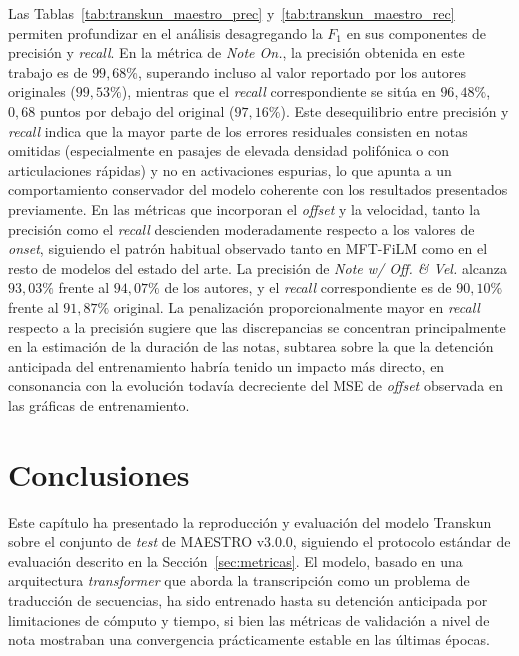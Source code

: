 \documentclass[11pt,spanish,listoffigures,listoftables]{tfgetsinf}
\begin{document}
Las Tablas~\ref{tab:transkun_maestro_prec} y~\ref{tab:transkun_maestro_rec} 
permiten profundizar en el análisis desagregando la $F_1$ en sus componentes de 
precisión y \textit{recall}. En la métrica de \textit{Note On.}, la precisión 
obtenida en este trabajo es de $99{,}68\%$, superando incluso al valor reportado 
por los autores originales ($99{,}53\%$), mientras que el \textit{recall} 
correspondiente se sitúa en $96{,}48\%$, $0{,}68$ puntos por debajo del original 
($97{,}16\%$). Este desequilibrio entre precisión y \textit{recall} indica que 
la mayor parte de los errores residuales consisten en notas omitidas (especialmente 
en pasajes de elevada densidad polifónica o con articulaciones rápidas) y no en 
activaciones espurias, lo que apunta a un comportamiento conservador del modelo 
coherente con los resultados presentados previamente. En las métricas que 
incorporan el \textit{offset} y la velocidad, tanto la precisión como el 
\textit{recall} descienden moderadamente respecto a los valores de \textit{onset}, 
siguiendo el patrón habitual observado tanto en MFT-FiLM como en el resto de 
modelos del estado del arte. La precisión de \textit{Note w/ Off. \& Vel.} alcanza 
$93{,}03\%$ frente al $94{,}07\%$ de los autores, y el \textit{recall} 
correspondiente es de $90{,}10\%$ frente al $91{,}87\%$ original. La penalización 
proporcionalmente mayor en \textit{recall} respecto a la precisión sugiere que las 
discrepancias se concentran principalmente en la estimación de la duración de las 
notas, subtarea sobre la que la detención anticipada del entrenamiento habría tenido 
un impacto más directo, en consonancia con la evolución todavía decreciente del 
MSE de \textit{offset} observada en las gráficas de entrenamiento.


\section{Conclusiones}
\label{sec:transkun_conclusiones}

Este capítulo ha presentado la reproducción y evaluación del modelo 
Transkun~\cite{yan2024transkun} sobre el conjunto de \textit{test} de MAESTRO 
v3.0.0, siguiendo el protocolo estándar de evaluación descrito en la 
Sección~\ref{sec:metricas}. El modelo, basado en una arquitectura 
\textit{transformer} que aborda la transcripción como un problema de traducción 
de secuencias, ha sido entrenado hasta su detención anticipada por limitaciones 
de cómputo y tiempo, si bien las métricas de validación a nivel de nota mostraban 
una convergencia prácticamente estable en las últimas épocas.
\end{document}
